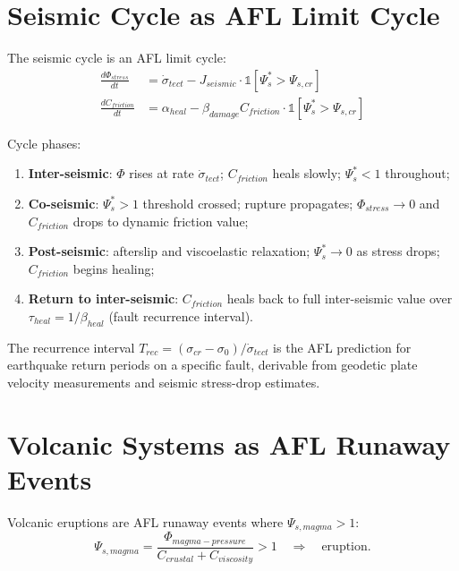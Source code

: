 \documentclass[11pt]{article}
\begin{document}
\section{Seismic Cycle as AFL Limit Cycle}

The seismic cycle is an AFL limit cycle:
\begin{align}
\frac{d\Phi_{stress}}{dt} &= \dot{\sigma}_{tect} - J_{seismic} \cdot \mathbb{1}[\Psi_s^* > \Psi_{s,cr}] \\
\frac{dC_{friction}}{dt} &= \alpha_{heal} - \beta_{damage} C_{friction} \cdot \mathbb{1}[\Psi_s^* > \Psi_{s,cr}]
\end{align}

Cycle phases:
\begin{enumerate}
    \item \textbf{Inter-seismic}: $\Phi$ rises at rate $\dot{\sigma}_{tect}$; $C_{friction}$ heals
          slowly; $\Psi_s^* < 1$ throughout;
    \item \textbf{Co-seismic}: $\Psi_s^* > 1$ threshold crossed; rupture propagates; $\Phi_{stress}
          \to 0$ and $C_{friction}$ drops to dynamic friction value;
    \item \textbf{Post-seismic}: afterslip and viscoelastic relaxation; $\Psi_s^* \to 0$ as stress
          drops; $C_{friction}$ begins healing;
    \item \textbf{Return to inter-seismic}: $C_{friction}$ heals back to full inter-seismic value
          over $\tau_{heal} = 1/\beta_{heal}$ (fault recurrence interval).
\end{enumerate}

The recurrence interval $T_{rec} = (\sigma_{cr} - \sigma_0)/\dot{\sigma}_{tect}$ is the AFL
prediction for earthquake return periods on a specific fault, derivable from geodetic plate
velocity measurements and seismic stress-drop estimates.

\section{Volcanic Systems as AFL Runaway Events}

Volcanic eruptions are AFL runaway events where $\Psi_{s,magma} > 1$:
\begin{equation}
\Psi_{s,magma} = \frac{\Phi_{magma-pressure}}{C_{crustal} + C_{viscosity}} > 1 \quad \Rightarrow \quad \text{eruption}.
\end{equation}
\end{document}
